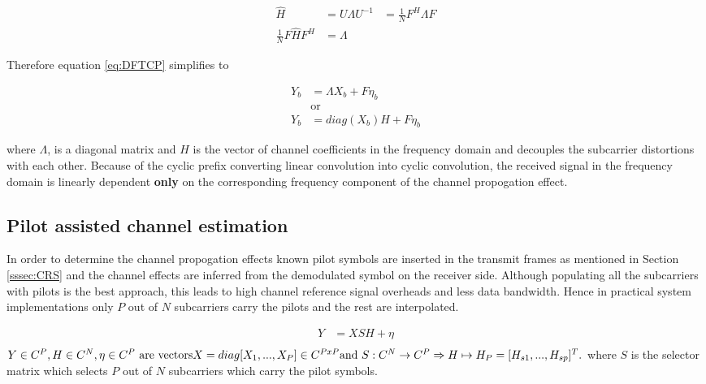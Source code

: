 \begin{equation}\label{eq:CircMtxExp}
    \begin{aligned}
        \hat{H} & = U\Lambda U^{-1}  & = \frac{1}{N}F^H \Lambda F\\
          \frac{1}{N}F\hat{H}F^H    & = \Lambda
    \end{aligned}
\end{equation}

Therefore equation \ref{eq:DFTCP} simplifies to 

\begin{equation}\label{eq:OFDMFinalEq}
    \begin{aligned}
        Y_b & = \Lambda{X_b} + F\eta_b \\ & \text{or} \\
        Y_b & = diag({X_b}){H} + F\eta_b
    \end{aligned}
\end{equation}

where $\Lambda$, is a diagonal matrix and ${H}$ is the vector of channel coefficients in the frequency domain and decouples the subcarrier distortions with each other. Because of the cyclic prefix converting linear convolution into cyclic convolution, the received signal in the frequency domain is linearly dependent \textbf{only} on the corresponding frequency component of the channel propogation effect.


\subsection{Pilot assisted channel estimation}\label{ssec:PilotAssistedChEst}


In order to determine the channel propogation effects known pilot symbols are inserted in the transmit frames as mentioned in Section \ref{sssec:CRS} and the channel effects are inferred from the demodulated symbol on the receiver side. Although populating all the subcarriers with pilots is the best approach, this leads to high channel reference signal overheads and less data bandwidth. Hence in practical system implementations only $P$ out of $N$ subcarriers carry the pilots and the rest are interpolated.

\begin{equation}\label{eq:OFDMChEstEq}
    \begin{aligned}
        Y & = XS{H} + \eta \\
    \end{aligned}
\end{equation}
$
Y \in \mathbb{C}^{P}, H \in \mathbb{C}^{N}, \eta \in \mathbb{C}^{P} \text{ are vectors}
\\ X = diag[X_{1},...,X_{P}] \in \mathbb{C}^{PxP}
\\ \text{and } S: \mathbb{C}^{N} \rightarrow \mathbb{C}^{P} \Rightarrow  H \mapsto H_P = [H_{s1},...,H_{sp}]^T.
$
where $S$ is the selector matrix which selects $P$ out of $N$ subcarriers which carry the pilot symbols.

